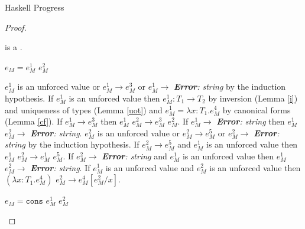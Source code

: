 \begin{theorem}{Haskell Progress}
\begin{proof}
\begin{case}
\begin{subcase}
\end{subcase}

\end{case}



\newcommand{\psconsm}{\expcons{\first{\varvalum}}{\second{\varvalum}}\xspace}

\begin{case}

\psconsm

\psconsm is a \profv.

\end{case}


\begin{case}

$e_{M}=e_{M}^{1}$ $e_{M}^{2}$

$e_{M}^{1}$ is an unforced value or $e_{M}^{1}\rightarrow e_{M}^{3}$ or $e_{M}^{1}\rightarrow$ \emph{\textbf{Error}: string} by the induction hypothesis.  If $e_{M}^{1}$ is an unforced value then $e_{M}^{1}:T_{1}\rightarrow T_{2}$ by inversion (Lemma \ref{i}) and uniqueness of types (Lemma \ref{uot}) and $e_{M}^{1}=\lambda x:T_{1}.e_{M}^{4}$ by canonical forms (Lemma \ref{cf}).  If $e_{M}^{1}\rightarrow e_{M}^{3}$ then $e_{M}^{1}$ $e_{M}^{2}\rightarrow e_{M}^{3}$ $e_{M}^{2}$.  If $e_{M}^{1}\rightarrow$ \emph{\textbf{Error}: string} then $e_{M}^{1}$ $e_{M}^{2}\rightarrow$ \emph{\textbf{Error}: string}.  $e_{M}^{2}$ is an unforced value or $e_{M}^{2}\rightarrow e_{M}^{5}$ or $e_{M}^{2}\rightarrow$ \emph{\textbf{Error}: string} by the induction hypothesis.  If $e_{M}^{2}\rightarrow e_{M}^{5}$ and $e_{M}^{1}$ is an unforced value then $e_{M}^{1}$ $e_{M}^{2}\rightarrow e_{M}^{1}$ $e_{M}^{5}$.  If $e_{M}^{2}\rightarrow$ \emph{\textbf{Error}: string} and $e_{M}^{1}$ is an unforced value then $e_{M}^{1}$ $e_{M}^{2}\rightarrow$ \emph{\textbf{Error}: string}.  If $e_{M}^{1}$ is an unforced value and $e_{M}^{2}$ is an unforced value then $(\lambda x:T_{1}.e_{M}^{4})$ $e_{M}^{2}\rightarrow e_{M}^{4}[e_{M}^{2}/x]$.

\end{case}


\begin{case}

$e_{M}=\mathtt{cons}$ $e_{M}^{1}$ $e_{M}^{2}$


\end{case}
\end{proof}
\end{theorem}
